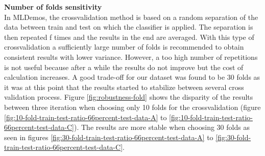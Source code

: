 \documentclass[a4paper,10pt]{article}
\begin{document}
\textbf{Number of folds sensitivity}\\
In MLDemos, the crossvalidation method is based on a random separation of the data between train and test on which the classifier is applied. The separation is then repeated f times and the results in the end are averaged. With this type of crossvalidation a sufficiently large number of folds is recommended to obtain consistent results with lower variance. However, a too high number of repetitions is not useful because after a while the results do not improve but the cost of calculation increases. A good trade-off for our dataset was found to be 30 folds as it was at this point that the results started to stabilize between several cross validation process. Figure \ref{fig:robustness-fold} shows the disparity of the results between three iteration when choosing only 10 folds for the crossvalidation (figure \ref{fig:10-fold-train-test-ratio-66percent-test-data-A} to \ref{fig:10-fold-train-test-ratio-66percent-test-data-C}). The results are more stable when choosing 30 folds as seen in figures \ref{fig:30-fold-train-test-ratio-66percent-test-data-A} to \ref{fig:30-fold-train-test-ratio-66percent-test-data-C}.
\end{document}
